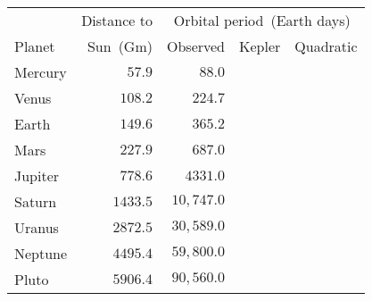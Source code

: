 \begin{tabular}{lrrrr}                                                 \toprule
        & Distance to & \multicolumn{3}{c}{Orbital period~(Earth days)} \\
  \cmidrule{3-5}
Planet  & Sun~(Gm)    & Observed  & Kepler & Quadratic \\\midrule
Mercury & $57.9$                  & $88.0$     \\
Venus   & $108.2$                 & $224.7$    \\
Earth   & $149.6$                 & $365.2$    \\
Mars    & $227.9$                 & $687.0$    \\
Jupiter & $778.6$                 & $4331.0$   \\
Saturn  & $1433.5$                & $10,747.0$ \\
Uranus  & $2872.5$                & $30,589.0$ \\
Neptune & $4495.4$                & $59,800.0$ \\
Pluto   & $5906.4$                & $90,560.0$ \\\bottomrule
\end{tabular}
